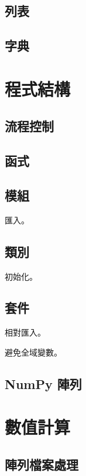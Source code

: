 \documentclass[a4paper,12pt]{book}
\begin{document}
\chapter{列表}

\chapter{字典}

\part{程式結構}

\chapter{流程控制}

\chapter{函式}

\chapter{模組}

匯入。

\chapter{類別}

初始化。

\chapter{套件}

相對匯入。

避免全域變數。

\chapter{NumPy 陣列}

\part{數值計算}

\chapter{陣列檔案處理}
\end{document}
